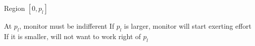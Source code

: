 \documentclass[usenames,dvipsnames]{beamer}
\newcommand{\bo}{\begin{outline}}
\newcommand{\eo}{\end{outline}}
\begin{document}
\begin{frame}{Region $[0,p_l]$}
\bo
\1 At $p_l$, monitor must be indifferent
\1 If $p_l$ is larger, monitor will start exerting effort
\1 If it is smaller, will not want to work right of $p_l$
\eo
\end{frame}

%
%
\end{document}
